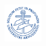 \begin{titlepage}

\begin{figure}[H]
    \centering
    \includegraphics[width=0.15\textwidth]{Setup/graphics/AU.png}
\end{figure}

\vfill
\end{titlepage}